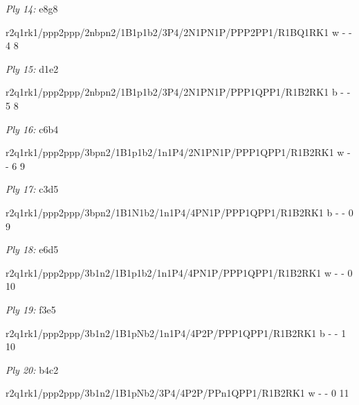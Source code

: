 \documentclass{article}
\begin{document}
\emph{Ply 14:} e8g8

r2q1rk1/ppp2ppp/2nbpn2/1B1p1b2/3P4/2N1PN1P/PPP2PP1/R1BQ1RK1 w - - 4 8


\showboard

\bigskip

\emph{Ply 15:} d1e2


r2q1rk1/ppp2ppp/2nbpn2/1B1p1b2/3P4/2N1PN1P/PPP1QPP1/R1B2RK1 b - - 5 8


\showboard

\bigskip

\emph{Ply 16:} c6b4

r2q1rk1/ppp2ppp/3bpn2/1B1p1b2/1n1P4/2N1PN1P/PPP1QPP1/R1B2RK1 w - - 6 9


\showboard

\bigskip

\emph{Ply 17:} c3d5


r2q1rk1/ppp2ppp/3bpn2/1B1N1b2/1n1P4/4PN1P/PPP1QPP1/R1B2RK1 b - - 0 9


\showboard

\bigskip

\emph{Ply 18:} e6d5

r2q1rk1/ppp2ppp/3b1n2/1B1p1b2/1n1P4/4PN1P/PPP1QPP1/R1B2RK1 w - - 0 10


\showboard

\bigskip

\emph{Ply 19:} f3e5


r2q1rk1/ppp2ppp/3b1n2/1B1pNb2/1n1P4/4P2P/PPP1QPP1/R1B2RK1 b - - 1 10


\showboard

\bigskip

\emph{Ply 20:} b4c2

r2q1rk1/ppp2ppp/3b1n2/1B1pNb2/3P4/4P2P/PPn1QPP1/R1B2RK1 w - - 0 11

\end{document}
